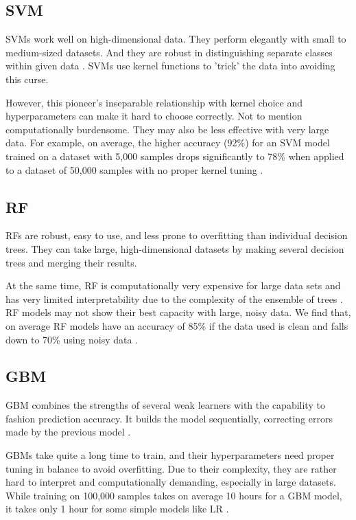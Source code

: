 \documentclass[conference]{IEEEtran}
\begin{document}
\subsection{SVM}\label{AA}
SVMs work well on high-dimensional data. They perform elegantly with small to medium-sized datasets. And they are robust in distinguishing separate classes within given data \cite{b11}. SVMs use kernel functions to 'trick' the data into avoiding this curse. 

However, this pioneer's inseparable relationship with kernel choice and hyperparameters can make it hard to choose correctly. Not to mention computationally burdensome. They may also be less effective with very large data. For example, on average, the higher accuracy (92\%) for an SVM model trained on a dataset with 5,000 samples drops significantly to 78\% when applied to a dataset of 50,000 samples with no proper kernel tuning \cite{b12}.

\subsection{RF}\label{AA}
RFs are robust, easy to use, and less prone to overfitting than individual decision trees. They can take large, high-dimensional datasets by making several decision trees and merging their results.

At the same time, RF is computationally very expensive for large data sets and has very limited interpretability due to the complexity of the ensemble of trees \cite{b13}. RF models may not show their best capacity with large, noisy data. We find that, on average RF models have an accuracy of 85\% if the data used is clean and falls down to 70\% using noisy data \cite{b14}.

\subsection{GBM}\label{AA}
GBM combines the strengths of several weak learners with the capability to fashion prediction accuracy. It builds the model sequentially, correcting errors made by the previous model \cite{b15}. 

GBMs take quite a long time to train, and their hyperparameters need proper tuning in balance to avoid overfitting. Due to their complexity, they are rather hard to interpret and computationally demanding, especially in large datasets. While training on 100,000 samples takes on average 10 hours for a GBM model, it takes only 1 hour for some simple models like LR \cite{b16}. 
\end{document}
